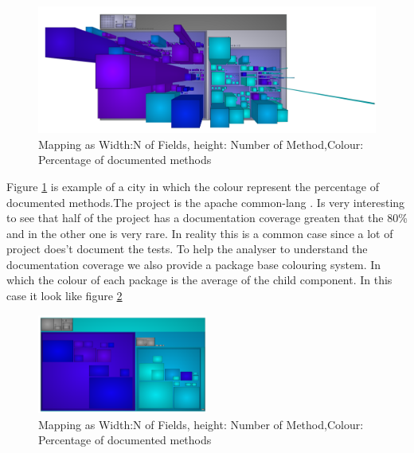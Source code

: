 \documentclass[]{usiinfbachelorproject}
\begin{document}
\begin{figure}[H]
	\centering
	\includegraphics[width=1\textwidth]{images/javaDoc}
	
	\caption[Java Documentation Mapping]{Mapping as Width:N of Fields, height: Number of Method,Colour: Percentage of documented methods\label{fig:javaDoc}}

\end{figure}

Figure \ref{fig:javaDoc} is example of a city in which the colour represent the percentage of documented methods.The project is the apache common-lang . Is very interesting to see that half of the project has a documentation coverage greaten that the 80\% and in the other one is very rare. In reality this is a common case since a lot of project does't document the tests.
To help the analyser to understand the documentation coverage we also provide a package base colouring system. In which the colour of each package is the average of the child component. In  this case it look like figure \ref{fig:OnlyPackage}

\begin{figure}[H]
	\centering
	\includegraphics[width=0.5\textwidth]{images/javaDocOnlyPackage}
	
	\caption[Java Documentation Mapping Only Package]{Mapping as Width:N of Fields, height: Number of Method,Colour: Percentage of documented methods\label{fig:OnlyPackage}}
\end{figure}
\end{document}
